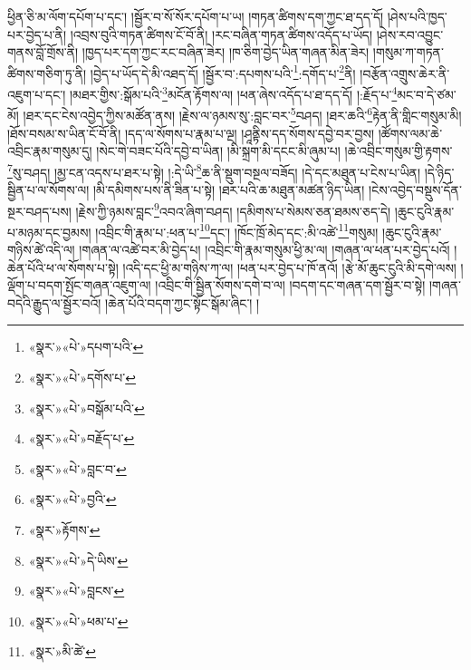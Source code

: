ཕྱིན་ཅི་མ་ལོག་དཔོག་པ་དང་། །སྦྱོར་བ་སོ་སོར་དཔོག་པ་ཡ། །གཏན་ཚིགས་དག་ཀྱང་ཐ་དད་དོ། །ཤེས་པའི་ཁྱད་པར་བྱེད་པ་ནི། །འབྲས་བུའི་གཏན་ཚིགས་ངོ་བོ་ནི། །རང་བཞིན་གཏན་ཚིགས་འདོད་པ་ཡོད། །ཤེས་རབ་འབྱུང་གནས་བློ་གྲོས་ནི། །ཁྱད་པར་དག་ཀྱང་རང་བཞིན་ཟེར། །ཁ་ཅིག་བྱེད་ཡིན་གཞན་མིན་ཟེར། །གསུམ་ཀ་གཏན་ཚིགས་གཅིག་ཏུ་ནི། །བྱེད་པ་ཡོད་དེ་མི་འཐད་དོ། །སྦྱོར་བ་:དཔགས་པའི་\footnote{«སྣར་»«པེ་»དཔག་པའི་}:དགོད་པ་\footnote{«སྣར་»«པེ་»དགོས་པ་}ནི། །བརྩོན་འགྲུས་ཆེར་ནི་འཇུག་པ་དང་། །མཐར་གྱིས་:སྒོམ་པའི་\footnote{«སྣར་»«པེ་»བསྒོམ་པའི་}མངོན་རྟོགས་ལ། །ཕན་ཞེས་འདོད་པ་ཐ་དད་དོ། །:རྗོད་པ་\footnote{«སྣར་»«པེ་»བརྗོད་པ་}མང་བ་དེ་ཙམ་མོ། །ཐར་དང་ངེས་འབྱེད་ཀྱིས་མཚོན་ནས། །རྗེས་ལ་ཉམས་སུ་:བླང་བར་\footnote{«སྣར་»«པེ་»བླང་བ་}བཤད། །ཐར་ཆའི་\footnote{«སྣར་»«པེ་»བྱའི་}རྟེན་ནི་གླིང་གསུམ་མི། །ཐོས་བསམ་ས་ཡིན་ངོ་བོ་ནི། །དད་ལ་སོགས་པ་རྣམ་པ་ལྔ། །ཤཱནྟིས་དད་སོགས་དབྱེ་བར་བྱས། །ཚོགས་ལམ་ཆེ་འབྲིང་རྣམ་གསུམ་དུ། །སེང་གེ་བཟང་པོའི་དབྱེ་བ་ཡིན། །མི་སྐྲག་མི་དངང་མི་ཞུམ་པ། །ཆེ་འབྲིང་གསུམ་གྱི་རྟགས་\footnote{«སྣར་»རྟོགས་}སུ་བཤད། །མྱ་ངན་འདས་པ་ཐར་པ་སྟེ། །:དེ་ཡི་\footnote{«སྣར་»«པེ་»དེ་ཡིས་}ཆ་ནི་སྡུག་བསྔལ་བཟོད། །དེ་དང་མཐུན་པ་ངེས་པ་ཡིན། །དེ་ཉིད་སྦྱིན་པ་ལ་སོགས་ལ། །མི་དམིགས་པས་ནི་ཟིན་པ་སྟེ། །ཐར་པའི་ཆ་མཐུན་མཚན་ཉིད་ཡིན། །ངེས་འབྱེད་བསྡུས་དོན་སྔར་བཤད་པས། །རྗེས་ཀྱི་ཉམས་བླང་\footnote{«སྣར་»«པེ་»བླངས་}འབའ་ཞིག་བཤད། །དམིགས་པ་སེམས་ཅན་ཐམས་ཅད་དེ། །ཆུང་ངུའི་རྣམ་པ་མཉམ་དང་བྱམས། །འབྲིང་གི་རྣམ་པ་:ཕན་པ་\footnote{«སྣར་»«པེ་»ཕམ་པ་}དང་། །ཁོང་ཁྲོ་མེད་དང་:མི་འཚེ་\footnote{«སྣར་»མི་ཚེ་}གསུམ། །ཆུང་ངུའི་རྣམ་གཉིས་ཚེ་འདི་ལ། །གཞན་ལ་འཚེ་བར་མི་བྱེད་པ། །འབྲིང་གི་རྣམ་གསུམ་ཕྱི་མ་ལ། །གཞན་ལ་ཕན་པར་བྱེད་པའོ། །ཆེན་པོའི་ཕ་ལ་སོགས་པ་སྟེ། །འདི་དང་ཕྱི་མ་གཉིས་ཀ་ལ། །ཕན་པར་བྱེད་པ་ཁོ་ནའོ། །རྩེ་མོ་ཆུང་ངུའི་མི་དགེ་ལས། །ལྡོག་པ་བདག་སྤོང་གཞན་འཇུག་ལ། །འབྲིང་གི་སྦྱིན་སོགས་དགེ་བ་ལ། །བདག་དང་གཞན་དག་སྦྱོར་བ་སྟེ། །གཞན་བདེའི་རྒྱུད་ལ་སྦྱོར་བའོ། །ཆེན་པོའི་བདག་ཀྱང་སྟོང་སྒོམ་ཞིང་། །
